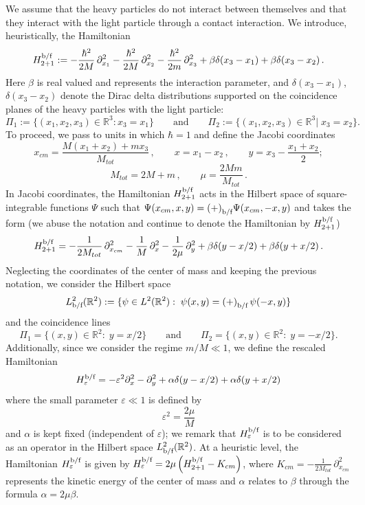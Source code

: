\documentclass[a4paper,11pt,reqno]{amsart}
\theoremstyle{definition}
\numberwithin{equation}{section}
\newcommand{\RE}{\mathbb R}
\newcommand{\ve}{\varepsilon}
\newcommand{\bof}{\text{\rm b/f}}
\newcommand{\bosferpm}{{(+)}}
\begin{document}
We assume that the heavy particles do not interact between themselves and that they interact with the light particle through a contact interaction. We introduce, heuristically, the  Hamiltonian 
\[
H^{\bof}_{2+1} := -\frac{\hbar^2}{2M}\, \partial^2_{x_1} -\frac{\hbar^2}{2M} \,\partial^2_{x_2} -\frac{\hbar^2}{2m} \,\partial^2_{x_3} + \beta \delta(x_3 - x_1) + \beta\delta (x_3-x_2)\,.
\]
Here $\beta$ is real valued and represents the interaction parameter, and $\delta(x_3 - x_1)$, $\delta (x_3-x_2)$ denote the Dirac delta distributions supported on the  coincidence planes of the heavy particles with the light particle: %
\[
\Pi_1:= \{(x_1,x_2,x_3)\in \RE^3: x_3 = x_1\} \qquad \text{and} \qquad  \Pi_2:= \{(x_1,x_2,x_3)\in \RE^3|\; x_3 = x_2\}.
\]
To proceed, we pass to units in which $\hbar =1$ and define the Jacobi coordinates
\[
x_{cm} = \frac{M(x_1+x_2)+m x_3}{M_{tot}} \,,\qquad x= x_1 - x_2 \,,\qquad  y = x_3 - \frac{x_1+x_2}{2} ; 
\]
\[
M_{tot} = 2M+m\,,\qquad \mu = \frac{2Mm}{M_{tot}}\,.
\]
In Jacobi coordinates, the Hamiltonian $H^{\bof}_{2+1}$ acts in the Hilbert space of square-integrable functions $\Psi$ such that $\Psi(x_{cm},x,y) = \bosferpm_{\bof}\Psi(x_{cm},-x,y)$ and takes the form (we abuse the notation and continue to denote the Hamiltonian by $H^{\bof}_{2+1}$)
\[
H^{\bof}_{2+1} = -\frac{1}{2M_{tot}}\,\partial^2_{x_{cm}}-\frac{1}{M}\,\partial^2_{x}-\frac{1}{2\mu}\,\partial^2_{y} + \beta\delta(y-x/2)+ \beta\delta(y+x/2)\, .
\]
Neglecting the coordinates of the center of mass and keeping the previous notation, we consider the Hilbert space
\[
L^2_{\bof}(\RE^2) := \{\psi\in L^2(\RE^2):\; \psi(x,y) =\bosferpm_{\bof} \,\psi(-x,y) \}
\]
and the coincidence lines
\begin{equation}\label{Pi12}
\Pi_1= \{(x,y) \in \RE^2:\; y = x/2\} \qquad \text{and}\qquad  \Pi_2=  \{(x,y) \in \RE^2:\; y = - x/2\} .
\end{equation}
Additionally, since we consider the regime $m/M\ll 1$, we define the rescaled Hamiltonian 
\[
H^{\bof}_{\ve} = -\ve^2 \partial^2_{x}-\partial^2_{y} + \alpha \delta(y-x/2)+ \alpha\delta(y+x/2)
\]
where the small parameter $\ve\ll 1$ is defined by  
\[
\ve^2 = \frac{2\mu}{M}
\]  
and $\alpha$ is  kept fixed (independent of $\ve$); we remark that $H^{\bof}_\ve$ is to be considered as an operator in the Hilbert space 
$ L^2_{\bof}(\RE^2)$. 
At a heuristic level, the Hamiltonian $H^{\bof}_\ve$ is given by  $H^{\bof}_\ve = 2 \mu  \left(H^{\bof}_{2+1} -K_{cm}\right)$, where $K_{cm}= -\frac{1}{2M_{tot}}\,\partial^2_{x_{cm}}$  represents the kinetic energy of the center of mass and $\alpha$ relates to $\beta$ through the formula   $\alpha = 2\mu\beta$.
\end{document}
